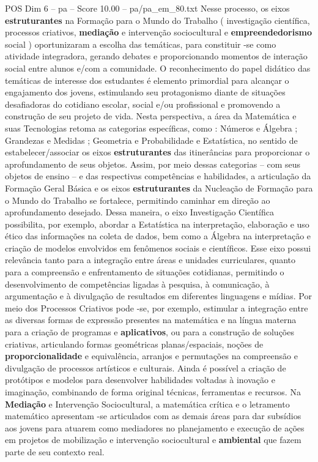 \begin{textsample}{POS Dim 6 – pa – Score 10.00 – pa/pa\_em\_80.txt}
Nesse processo, os eixos \textbf{estruturantes} na Formação para o Mundo do Trabalho ( investigação científica, processos criativos, \textbf{mediação} e intervenção sociocultural e \textbf{empreendedorismo} social ) oportunizaram a escolha das temáticas, para constituir -se como atividade integradora, gerando debates e proporcionando momentos de interação social entre alunos e/com a comunidade.
O reconhecimento do papel didático das temáticas de interesse dos estudantes é elemento primordial para alcançar o engajamento dos jovens, estimulando seu protagonismo diante de situações desafiadoras do cotidiano escolar, social e/ou profissional e promovendo a construção de seu projeto de vida.
Nesta perspectiva, a área da Matemática e suas Tecnologias retoma as categorias específicas, como : Números e Álgebra ; Grandezas e Medidas ; Geometria e Probabilidade e Estatística, no sentido de estabelecer/associar os eixos \textbf{estruturantes} das itinerâncias para proporcionar o aprofundamento de seus objetos.
Assim, por meio dessas categorias – com seus objetos de ensino – e das respectivas competências e habilidades, a articulação da Formação Geral Básica e os eixos \textbf{estruturantes} da Nucleação de Formação para o Mundo do Trabalho se fortalece, permitindo caminhar em direção ao aprofundamento desejado.
Dessa maneira, o eixo Investigação Científica possibilita, por exemplo, abordar a Estatística na interpretação, elaboração e uso ético das informações na coleta de dados, bem como a Álgebra na interpretação e criação de modelos envolvidos em fenômenos sociais e científicos.
Esse eixo possui relevância tanto para a integração entre áreas e unidades curriculares, quanto para a compreensão e enfrentamento de situações cotidianas, permitindo o desenvolvimento de competências ligadas à pesquisa, à comunicação, à argumentação e à divulgação de resultados em diferentes linguagens e mídias.
Por meio dos Processos Criativos pode -se, por exemplo, estimular a integração entre as diversas formas de expressão presentes na matemática e na língua materna para a criação de programas e \textbf{aplicativos}, ou para a construção de soluções criativas, articulando formas geométricas planas/espaciais, noções de \textbf{proporcionalidade} e equivalência, arranjos e permutações na compreensão e divulgação de processos artísticos e culturais.
Ainda é possível a criação de protótipos e modelos para desenvolver habilidades voltadas à inovação e imaginação, combinando de forma original técnicas, ferramentas e recursos.
Na \textbf{Mediação} e Intervenção Sociocultural, a matemática crítica e o letramento matemático apresentam -se articulados com as demais áreas para dar subsídios aos jovens para atuarem como mediadores no planejamento e execução de ações em projetos de mobilização e intervenção sociocultural e \textbf{ambiental} que fazem parte de seu contexto real.

\end{textsample}
